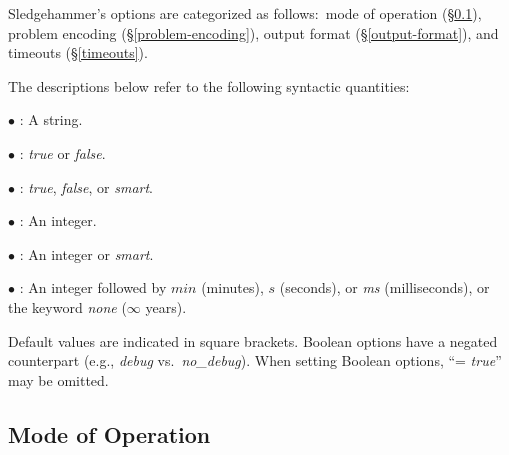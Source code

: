 \documentclass[a4paper,12pt]{article}
\begin{document}
Sledgehammer's options are categorized as follows:\ mode of operation
(\S\ref{mode-of-operation}), problem encoding (\S\ref{problem-encoding}), output
format (\S\ref{output-format}), and timeouts (\S\ref{timeouts}).

The descriptions below refer to the following syntactic quantities:

\begin{enum}
\item[$\bullet$] : A string.
\item[$\bullet$] : \textit{true} or \textit{false}.
\item[$\bullet$] : \textit{true}, \textit{false}, or \textit{smart}.
\item[$\bullet$] : An integer.
\item[$\bullet$] : An integer or \textit{smart}.
\item[$\bullet$] : An integer followed by $\textit{min}$ (minutes), $s$ (seconds), or \textit{ms}
(milliseconds), or the keyword \textit{none} ($\infty$ years).
\end{enum}

Default values are indicated in square brackets. Boolean options have a negated
counterpart (e.g., \textit{debug} vs.\ \textit{no\_debug}). When setting
Boolean options, ``= \textit{true}'' may be omitted.

\subsection{Mode of Operation}
\label{mode-of-operation}
\end{document}
